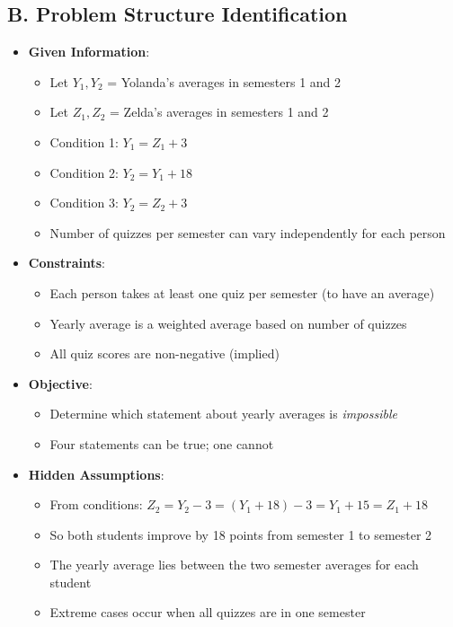 \documentclass[12pt]{article}
\begin{document}
\begin{problemconfigbox}
\subsection*{B. Problem Structure Identification}
\begin{itemize}[leftmargin=*]
    \item \textbf{Given Information}: 
    \begin{itemize}
        \item Let $Y_1, Y_2$ = Yolanda's averages in semesters 1 and 2
        \item Let $Z_1, Z_2$ = Zelda's averages in semesters 1 and 2
        \item Condition 1: $Y_1 = Z_1 + 3$
        \item Condition 2: $Y_2 = Y_1 + 18$
        \item Condition 3: $Y_2 = Z_2 + 3$
        \item Number of quizzes per semester can vary independently for each person
    \end{itemize}
    \item \textbf{Constraints}: 
    \begin{itemize}
        \item Each person takes at least one quiz per semester (to have an average)
        \item Yearly average is a weighted average based on number of quizzes
        \item All quiz scores are non-negative (implied)
    \end{itemize}
    \item \textbf{Objective}: 
    \begin{itemize}
        \item Determine which statement about yearly averages is \textit{impossible}
        \item Four statements can be true; one cannot
    \end{itemize}
    \item \textbf{Hidden Assumptions}: 
    \begin{itemize}
        \item From conditions: $Z_2 = Y_2 - 3 = (Y_1 + 18) - 3 = Y_1 + 15 = Z_1 + 18$
        \item So both students improve by 18 points from semester 1 to semester 2
        \item The yearly average lies between the two semester averages for each student
        \item Extreme cases occur when all quizzes are in one semester

\end{itemize}
\end{itemize}
\end{problemconfigbox}
\end{document}
